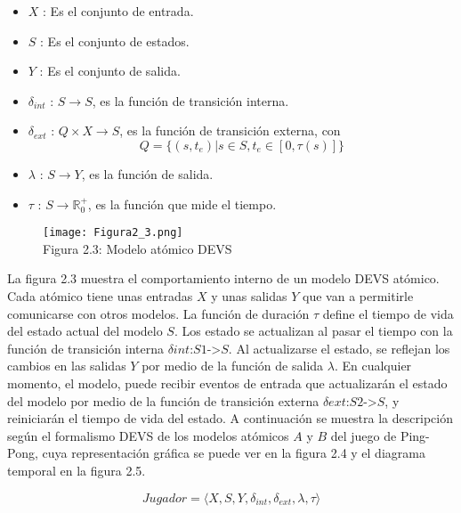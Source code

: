 \begin{itemize}
\item $X$ : Es el conjunto de entrada.	
\item $S$ : Es el conjunto de estados. 
\item $Y$ : Es el conjunto de salida.
\item $\delta_{int}$ : $S\rightarrow S$, es la función de transición interna.
\item $\delta_{ext}$ : $Q\times X\rightarrow S$, es la función de transición externa, con
\begin{equation}\label{eq:FullState}
Q = \lbrace(s,t_e) | s\in S, t_e\in [0,\tau (s)]\rbrace
\end{equation}
\item $\lambda$ : $S\rightarrow Y$, es la función de salida.
\item $\tau$ : $S\rightarrow \mathbb{R}^{+}_{0}$, es la función que mide el tiempo.
\end{itemize}

\begin{figure}[!ht]
\begin{center}
\texttt{[image: Figura2\_3.png]}\\[0.5cm]
Figura 2.3: Modelo atómico DEVS
\end{center}
\end{figure}

La figura 2.3 muestra el comportamiento interno de un modelo DEVS atómico. Cada atómico tiene unas entradas $X$ y unas salidas $Y$ que van a permitirle comunicarse con otros modelos. La función de duración $\tau$ define el tiempo de vida del estado actual del modelo $S$. Los estado se actualizan al pasar el tiempo con la función de transición interna $\delta{int}$:$S{1}$->$S$. Al actualizarse el estado, se reflejan los cambios en las salidas $Y$ por medio de la función de salida $\lambda$. En cualquier momento, el modelo, puede recibir eventos de entrada que actualizarán el estado del modelo por medio de la función de transición externa $\delta{ext}$:$S{2}$->$S$, y reiniciarán el tiempo de vida del estado.
A continuación se muestra la descripción según el formalismo DEVS de los modelos atómicos $A$ y $B$ del juego de Ping-Pong, cuya representación gráfica se puede ver en la figura 2.4 y el diagrama temporal en la figura 2.5.

\begin{equation}\label{eq:PingPong1}
Jugador = \langle X,S,Y,\delta_{int},\delta_{ext},\lambda,\tau\rangle
\end{equation}

